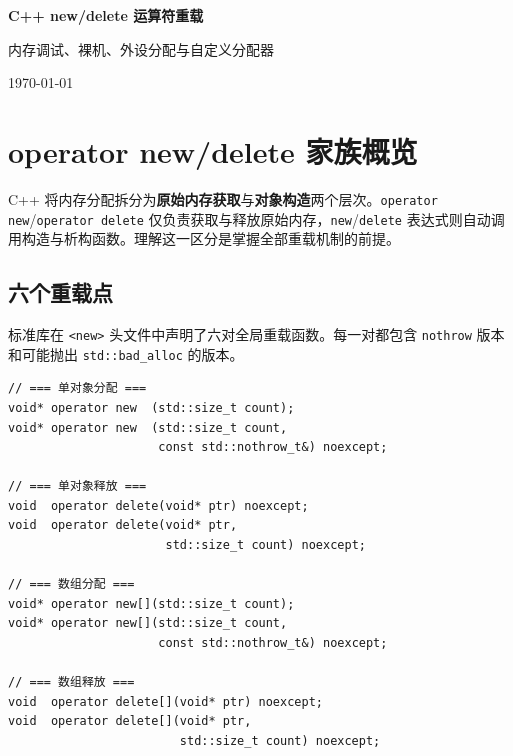 \documentclass[12pt,a4paper,fontset=fandol]{ctexbook}
\begin{document}
\frontmatter

\begin{titlepage}
\centering
\vspace*{4cm}
{\Huge\bfseries C++ new/delete 运算符重载\par}
\vspace{1cm}
{\LARGE 内存调试、裸机、外设分配与自定义分配器\par}
\vfill
{\large \today\par}
\end{titlepage}

\tableofcontents

\mainmatter

\chapter{operator new/delete 家族概览}

C++ 将内存分配拆分为\textbf{原始内存获取}与\textbf{对象构造}两个层次。\texttt{operator new}/\allowbreak{}\texttt{operator delete} 仅负责获取与释放原始内存，\texttt{new}/\allowbreak{}\texttt{delete} 表达式则自动调用构造与析构函数。理解这一区分是掌握全部重载机制的前提。

\section{六个重载点}

标准库在 \texttt{<new>} 头文件中声明了六对全局重载函数。每一对都包含
\texttt{nothrow} 版本和可能抛出 \texttt{std::bad\_alloc} 的版本。

\begin{lstlisting}
// === 单对象分配 ===
void* operator new  (std::size_t count);
void* operator new  (std::size_t count,
                     const std::nothrow_t&) noexcept;

// === 单对象释放 ===
void  operator delete(void* ptr) noexcept;
void  operator delete(void* ptr,
                      std::size_t count) noexcept;

// === 数组分配 ===
void* operator new[](std::size_t count);
void* operator new[](std::size_t count,
                     const std::nothrow_t&) noexcept;

// === 数组释放 ===
void  operator delete[](void* ptr) noexcept;
void  operator delete[](void* ptr,
                        std::size_t count) noexcept;
\end{lstlisting}
\end{document}
